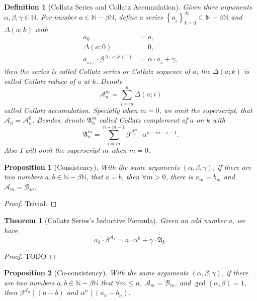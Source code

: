 \documentclass[a4paper,11pt]{article}
\theoremstyle{sltheorem}
\newtheorem{definition}{Definition}
\newtheorem{theorem}{Theorem}
\newtheorem{proposition}{Proposition}
\newcommand{\CollatzReduce}[2]{\Delta({#1};{#2})}
\newcommand\ModSupportSet[2]{{{\displaystyle #1}}-{{\displaystyle #2}}}
\begin{document}
\begin{definition}[Collatz Series and Collatz Accumulation]
	Given three arguments $\alpha, \beta, \gamma \in \mathbb{N}$. For number $a \in \ModSupportSet{\mathbb{N}}{\beta\mathbb{N}}$, define a series $\left\{a_{_k}\right\}_{k = 0}^{\infty} \subset \ModSupportSet{\mathbb{N}}{\beta\mathbb{N}}$ and $\CollatzReduce{a}{k}$ with
	\[\begin{aligned}
        a_0 &=a, \\
        \CollatzReduce{a}{0} &=0, \\
        a_{_{k + 1}} \cdot \beta^{\CollatzReduce{a}{k + 1}} &= \alpha\cdot a_{_k} + \gamma,
    \end{aligned}\]
	then the series is called Collatz series or Collatz sequence of $a$, the $\CollatzReduce{a}{k}$ is called Collatz reduce of $a$ at $k$.
    Denote 
	\[\mathcal{A}_n^{m} = \sum_{i=m}^{n}\CollatzReduce{a}{i}\]
	called Collatz accumulation. Specially when $m = 0$, we omit the superscript, that $\mathcal{A}_n = \mathcal{A}_n^{0}$.\newline
	Besides, denote $\mathfrak{A}_n^{m}$ called Collatz complement of $a$ on $k$ with
	\[ \mathfrak{A}_n^{m} = \sum_{i = m}^{n - m - 1}\beta^{\mathcal{A}_i^{m}}\cdot\alpha^{n-m-i-1}. \]
	Also I will omit the superscript $m$ when $m = 0$.
\end{definition}
\begin{proposition}[Consistency]\label{proposition:consistency}
With the same arguments $(\alpha, \beta, \gamma)$, if there are two numbers $a, b \in \ModSupportSet{\mathbb{N}}{\beta\mathbb{N}}$, that $a = b$, then $\forall m > 0$, 
there is $a_m = b_m$ and $\mathcal{A}_m = \mathcal{B}_m$.
\end{proposition}
\begin{proof} Trivial. \end{proof}
\begin{theorem}[Collatz Series's Inductive Formula]\label{theorem:inductive-formula}
Given an odd number $a$, we have
\[ a_k \cdot \beta^{\mathcal{A}_k} = a \cdot\alpha^k + \gamma\cdot\mathfrak{A}_k. \]
\end{theorem}
\begin{proof} TODO \end{proof}
\begin{proposition}[Co-consistency]\label{proposition:co-consistency}
    With the same arguments $(\alpha, \beta, \gamma)$, if there are two numbers $a, b \in \ModSupportSet{\mathbb{N}}{\beta\mathbb{N}}$ that $\forall m \le n$, $\mathcal{A}_m = \mathcal{B}_m$, and $\gcd(\alpha, \beta) = 1$, then $\beta^{\mathcal{A}_n} \mid (a - b)$ and $\alpha^{n} \mid (a_n - b_n)$.
\end{proposition}
\end{document}
